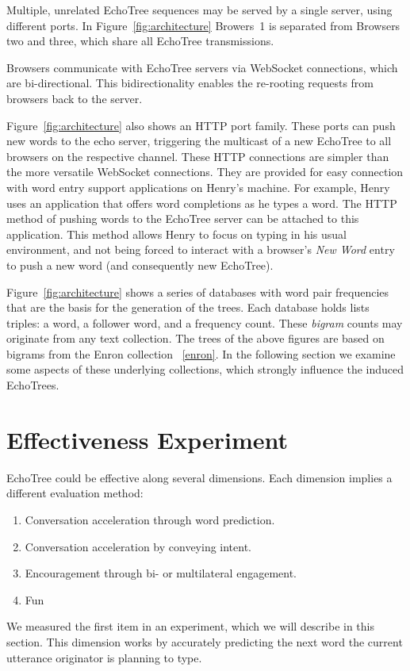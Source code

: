 \documentclass{sigchi}
\begin{document}
Multiple, unrelated EchoTree sequences may be served by a single
server, using different ports. In Figure~\ref{fig:architecture}
Browers~1 is separated from Browsers two and three, which share all
EchoTree transmissions.

Browsers communicate with EchoTree servers via WebSocket connections,
which are bi-directional. This bidirectionality enables the re-rooting
requests from browsers back to the server.

Figure~\ref{fig:architecture} also shows an HTTP port family. These
ports can push new words to the echo server, triggering the multicast
of a new EchoTree to all browsers on the respective channel. These
HTTP connections are simpler than the more versatile WebSocket
connections. They are provided for easy connection with word entry
support applications on Henry's machine. For example, Henry uses an
application that offers word completions as he types a word. The HTTP
method of pushing words to the EchoTree server can be attached to this
application. This method allows Henry to focus on typing in his usual
environment, and not being forced to interact with a browser's {\em
  New Word} entry to push a new word (and consequently new EchoTree).

Figure~\ref{fig:architecture} shows a series of databases with word
pair frequencies that are the basis for the generation of the
trees. Each database holds lists triples: a word, a follower word, and
a frequency count. These {\em bigram} counts may originate from any
text collection. The trees of the above figures are based on bigrams
from the Enron collection ~\ref{enron}. In the following section we
examine some aspects of these underlying collections, which strongly
influence the induced EchoTrees.

\section{Effectiveness Experiment}

EchoTree could be effective along several dimensions. Each dimension
implies a different evaluation method:
\begin{enumerate}
\item Conversation acceleration through word prediction.
\item Conversation acceleration by conveying intent.
\item Encouragement through bi- or multilateral engagement.
\item Fun
\end{enumerate}
We measured the first item in an experiment, which we will describe in
this section. This dimension works by accurately predicting the next
word the current utterance originator is planning to type.
\end{document}
